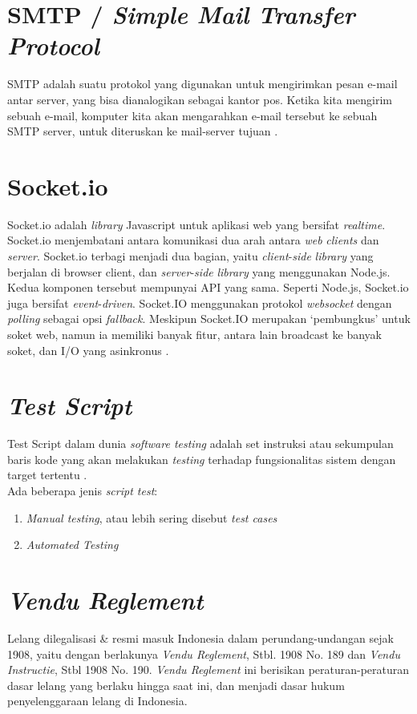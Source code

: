 	\section{SMTP / \textit{Simple Mail Transfer Protocol}}
	SMTP adalah suatu protokol yang digunakan untuk mengirimkan pesan e-mail antar server, yang bisa dianalogikan sebagai kantor pos. Ketika kita mengirim sebuah e-mail, komputer kita akan mengarahkan e-mail tersebut ke sebuah SMTP server, untuk diteruskan ke mail-server tujuan \cite{noauthor_smtp_nodate}. 
	
	\section{Socket.io}
	Socket.io adalah \textit{library} Javascript untuk aplikasi web yang bersifat \textit{realtime}. Socket.io menjembatani antara komunikasi dua arah antara \textit{web} \textit{clients} dan \textit{server}. Socket.io terbagi menjadi dua bagian, yaitu \textit{client}-\textit{side} \textit{library} yang berjalan di browser client, dan \textit{server}-\textit{side} \textit{library} yang menggunakan Node.js. Kedua komponen tersebut mempunyai API yang sama. Seperti Node.js, Socket.io juga bersifat \textit{event}-\textit{driven}. Socket.IO menggunakan protokol \textit{websocket} dengan \textit{polling} sebagai opsi \textit{fallback}. Meskipun Socket.IO merupakan ‘pembungkus’ untuk soket web, namun ia memiliki banyak fitur, antara lain broadcast ke banyak soket, dan I/O yang asinkronus \cite{noauthor_socket.io_2016}.
	
	\section{\textit{Test Script}}
	Test Script dalam dunia \textit{software testing} adalah set instruksi atau sekumpulan baris kode yang akan melakukan \textit{testing} terhadap fungsionalitas sistem dengan target tertentu \cite{noauthor_test_2016}.
	\\ \indent Ada beberapa jenis \textit{script test}:
	\begin{enumerate}
	  	\item \textit{Manual testing}, atau lebih sering disebut \textit{test cases}
	  	\item \textit{Automated Testing}
	\end{enumerate}
	
	\section{\textit{Vendu Reglement}}
	Lelang dilegalisasi \& resmi masuk Indonesia dalam perundang-undangan sejak 1908, yaitu dengan berlakunya \textit{Vendu Reglement}, Stbl. 1908 No. 189 dan \textit{Vendu Instructie}, Stbl 1908 No. 190. \textit{Vendu Reglement} ini berisikan peraturan-peraturan dasar lelang yang berlaku hingga saat ini, dan menjadi dasar hukum penyelenggaraan lelang di Indonesia\cite{balailelang_sejarah_nodate}.
	
